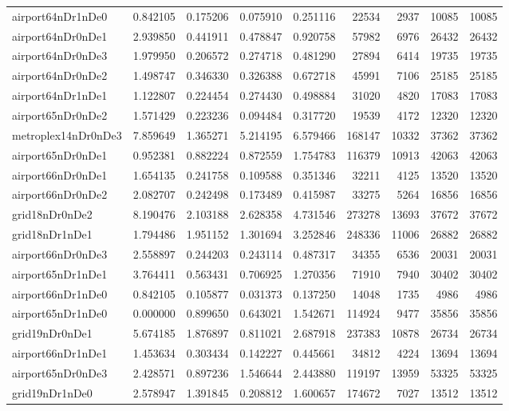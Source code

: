 \begin{longtable}{|l|r|r|r|r|r|r|r|r|}
airport64nDr1nDe0 & 0.842105 & 0.175206 & 0.075910 & 0.251116 & 22534 & 2937 & 10085 & 10085 \\
airport64nDr0nDe1 & 2.939850 & 0.441911 & 0.478847 & 0.920758 & 57982 & 6976 & 26432 & 26432 \\
airport64nDr0nDe3 & 1.979950 & 0.206572 & 0.274718 & 0.481290 & 27894 & 6414 & 19735 & 19735 \\
airport64nDr0nDe2 & 1.498747 & 0.346330 & 0.326388 & 0.672718 & 45991 & 7106 & 25185 & 25185 \\
airport64nDr1nDe1 & 1.122807 & 0.224454 & 0.274430 & 0.498884 & 31020 & 4820 & 17083 & 17083 \\
airport65nDr0nDe2 & 1.571429 & 0.223236 & 0.094484 & 0.317720 & 19539 & 4172 & 12320 & 12320 \\
metroplex14nDr0nDe3 & 7.859649 & 1.365271 & 5.214195 & 6.579466 & 168147 & 10332 & 37362 & 37362 \\
airport65nDr0nDe1 & 0.952381 & 0.882224 & 0.872559 & 1.754783 & 116379 & 10913 & 42063 & 42063 \\
airport66nDr0nDe1 & 1.654135 & 0.241758 & 0.109588 & 0.351346 & 32211 & 4125 & 13520 & 13520 \\
airport66nDr0nDe2 & 2.082707 & 0.242498 & 0.173489 & 0.415987 & 33275 & 5264 & 16856 & 16856 \\
grid18nDr0nDe2 & 8.190476 & 2.103188 & 2.628358 & 4.731546 & 273278 & 13693 & 37672 & 37672 \\
grid18nDr1nDe1 & 1.794486 & 1.951152 & 1.301694 & 3.252846 & 248336 & 11006 & 26882 & 26882 \\
airport66nDr0nDe3 & 2.558897 & 0.244203 & 0.243114 & 0.487317 & 34355 & 6536 & 20031 & 20031 \\
airport65nDr1nDe1 & 3.764411 & 0.563431 & 0.706925 & 1.270356 & 71910 & 7940 & 30402 & 30402 \\
airport66nDr1nDe0 & 0.842105 & 0.105877 & 0.031373 & 0.137250 & 14048 & 1735 & 4986 & 4986 \\
airport65nDr1nDe0 & 0.000000 & 0.899650 & 0.643021 & 1.542671 & 114924 & 9477 & 35856 & 35856 \\
grid19nDr0nDe1 & 5.674185 & 1.876897 & 0.811021 & 2.687918 & 237383 & 10878 & 26734 & 26734 \\
airport66nDr1nDe1 & 1.453634 & 0.303434 & 0.142227 & 0.445661 & 34812 & 4224 & 13694 & 13694 \\
airport65nDr0nDe3 & 2.428571 & 0.897236 & 1.546644 & 2.443880 & 119197 & 13959 & 53325 & 53325 \\
grid19nDr1nDe0 & 2.578947 & 1.391845 & 0.208812 & 1.600657 & 174672 & 7027 & 13512 & 13512 \\

\end{longtable}
